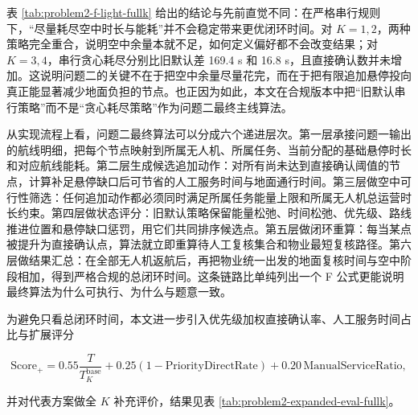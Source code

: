\documentclass[12pt]{article}
\begin{document}
表 \ref{tab:problem2-f-light-fullk} 给出的结论与先前直觉不同：在严格串行规则下，“尽量耗尽空中时长与能耗”并不会稳定带来更优闭环时间。对 $K=1,2$，两种策略完全重合，说明空中余量本就不足，如何定义偏好都不会改变结果；对 $K=3,4$，串行贪心耗尽分别比旧默认差 169.4 s 和 16.8 s，且直接确认数并未增加。这说明问题二的关键不在于把空中余量尽量花完，而在于把有限追加悬停投向真正能显著减少地面负担的节点。也正因为如此，本文在合规版本中把“旧默认串行策略”而不是“贪心耗尽策略”作为问题二最终主线算法。

从实现流程上看，问题二最终算法可以分成六个递进层次。第一层承接问题一输出的航线明细，把每个节点映射到所属无人机、所属任务、当前分配的基础悬停时长和对应航线能耗。第二层生成候选追加动作：对所有尚未达到直接确认阈值的节点，计算补足悬停缺口后可节省的人工服务时间与地面通行时间。第三层做空中可行性筛选：任何追加动作都必须同时满足所属任务能量上限和所属无人机总运营时长约束。第四层做状态评分：旧默认策略保留能量松弛、时间松弛、优先级、路线推进位置和悬停缺口惩罚，用它们共同排序候选点。第五层做闭环重算：每当某点被提升为直接确认点，算法就立即重算待人工复核集合和物业最短复核路径。第六层做结果汇总：在全部无人机返航后，再把物业统一出发的地面复核时间与空中阶段相加，得到严格合规的总闭环时间。这条链路比单纯列出一个 F 公式更能说明最终算法为什么可执行、为什么与题意一致。

为避免只看总闭环时间，本文进一步引入优先级加权直接确认率、人工服务时间占比与扩展评分

\begin{equation}
\text{Score}_{+} = 0.55\frac{T}{T^{\text{base}}_K} + 0.25\left(1-\text{PriorityDirectRate}\right) + 0.20\,\text{ManualServiceRatio},
\end{equation}

并对代表方案做全 $K$ 补充评价，结果见表 \ref{tab:problem2-expanded-eval-fullk}。
\end{document}
